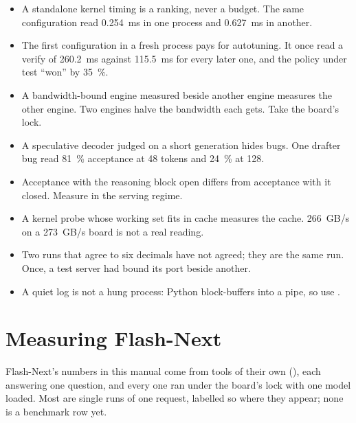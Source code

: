 \begin{itemize}
\item A standalone kernel timing is a ranking, never a budget. The same configuration read 0.254~ms in one process and 0.627~ms in another.
\item The first configuration in a fresh process pays for autotuning. It once read a verify of 260.2~ms against 115.5~ms for every later one, and the policy under test \enquote{won} by 35~\%.
\item A bandwidth-bound engine measured beside another engine measures the other engine. Two engines halve the bandwidth each gets. Take the board's lock.
\item A speculative decoder judged on a short generation hides bugs. One drafter bug read 81~\% acceptance at 48 tokens and 24~\% at 128.
\item Acceptance with the reasoning block open differs from acceptance with it closed. Measure in the serving regime.
\item A kernel probe whose working set fits in cache measures the cache. 266~GB/s on a 273~GB/s board is not a real reading.
\item Two runs that agree to six decimals have not agreed; they are the same run. Once, a test server had bound its port beside another.
\item A quiet log is not a hung process: Python block-buffers into a pipe, so use .
\end{itemize}

\section{Measuring Flash-Next}\label{sec:measure-flashnext}

Flash-Next's numbers in this manual come from tools of their own (), each answering one question, and every one ran under the board's lock with one model loaded. Most are single runs of one request, labelled so where they appear; none is a benchmark row yet.

